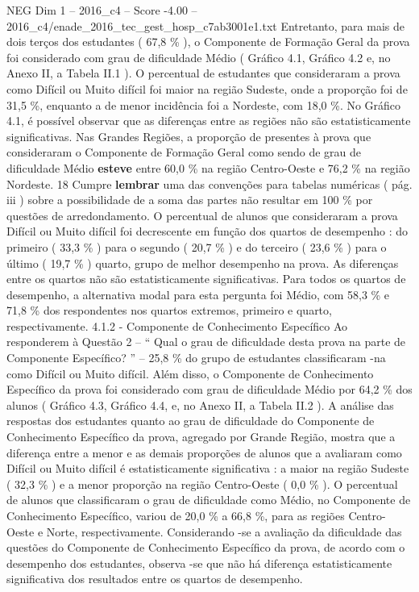 \begin{textsample}{NEG Dim 1 – 2016\_c4 – Score -4.00 – 2016\_c4/enade\_2016\_tec\_gest\_hosp\_c7ab3001e1.txt}
Entretanto, para mais de dois terços dos estudantes ( 67,8 \% ), o Componente de Formação Geral da prova foi considerado com grau de dificuldade Médio ( Gráfico 4.1, Gráfico 4.2 e, no Anexo II, a Tabela II.1 ).
O percentual de estudantes que consideraram a prova como Difícil ou Muito difícil foi maior na região Sudeste, onde a proporção foi de 31,5 \%, enquanto a de menor incidência foi a Nordeste, com 18,0 \%.
No Gráfico 4.1, é possível observar que as diferenças entre as regiões não são estatisticamente significativas.
Nas Grandes Regiões, a proporção de presentes à prova que consideraram o Componente de Formação Geral como sendo de grau de dificuldade Médio \textbf{esteve} entre 60,0 \% na região Centro-Oeste e 76,2 \% na região Nordeste. 18 Cumpre \textbf{lembrar} uma das convenções para tabelas numéricas ( pág. iii ) sobre a possibilidade de a soma das partes não resultar em 100 \% por questões de arredondamento.
O percentual de alunos que consideraram a prova Difícil ou Muito difícil foi decrescente em função dos quartos de desempenho : do primeiro ( 33,3 \% ) para o segundo ( 20,7 \% ) e do terceiro ( 23,6 \% ) para o último ( 19,7 \% ) quarto, grupo de melhor desempenho na prova.
As diferenças entre os quartos não são estatisticamente significativas.
Para todos os quartos de desempenho, a alternativa modal para esta pergunta foi Médio, com 58,3 \% e 71,8 \% dos respondentes nos quartos extremos, primeiro e quarto, respectivamente. 4.1.2 - Componente de Conhecimento Específico Ao responderem à Questão 2 – “ Qual o grau de dificuldade desta prova na parte de Componente Específico? ” – 25,8 \% do grupo de estudantes classificaram -na como Difícil ou Muito difícil.
Além disso, o Componente de Conhecimento Específico da prova foi considerado com grau de dificuldade Médio por 64,2 \% dos alunos ( Gráfico 4.3, Gráfico 4.4, e, no Anexo II, a Tabela II.2 ).
A análise das respostas dos estudantes quanto ao grau de dificuldade do Componente de Conhecimento Específico da prova, agregado por Grande Região, mostra que a diferença entre a menor e as demais proporções de alunos que a avaliaram como Difícil ou Muito difícil é estatisticamente significativa : a maior na região Sudeste ( 32,3 \% ) e a menor proporção na região Centro-Oeste ( 0,0 \% ).
O percentual de alunos que classificaram o grau de dificuldade como Médio, no Componente de Conhecimento Específico, variou de 20,0 \% a 66,8 \%, para as regiões Centro-Oeste e Norte, respectivamente.
Considerando -se a avaliação da dificuldade das questões do Componente de Conhecimento Específico da prova, de acordo com o desempenho dos estudantes, observa -se que não há diferença estatisticamente significativa dos resultados entre os quartos de desempenho.

\end{textsample}
